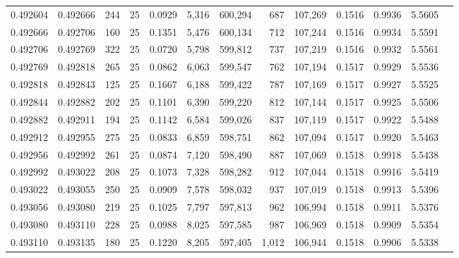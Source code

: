 \begin{tabular}{rrrrrrrrrrrrr}
0.492604 & 0.492666 & 244 &  25 &                                     0.0929 &   5,316 & 600,294 &     687 & 107,269 & 0.1516 & 0.9936 & 5.5605 \\
0.492666 & 0.492706 & 160 &  25 &                                     0.1351 &   5,476 & 600,134 &     712 & 107,244 & 0.1516 & 0.9934 & 5.5591 \\
0.492706 & 0.492769 & 322 &  25 &                                     0.0720 &   5,798 & 599,812 &     737 & 107,219 & 0.1516 & 0.9932 & 5.5561 \\
0.492769 & 0.492818 & 265 &  25 &                                     0.0862 &   6,063 & 599,547 &     762 & 107,194 & 0.1517 & 0.9929 & 5.5536 \\
0.492818 & 0.492843 & 125 &  25 &                                     0.1667 &   6,188 & 599,422 &     787 & 107,169 & 0.1517 & 0.9927 & 5.5525 \\
0.492844 & 0.492882 & 202 &  25 &                                     0.1101 &   6,390 & 599,220 &     812 & 107,144 & 0.1517 & 0.9925 & 5.5506 \\
0.492882 & 0.492911 & 194 &  25 &                                     0.1142 &   6,584 & 599,026 &     837 & 107,119 & 0.1517 & 0.9922 & 5.5488 \\
0.492912 & 0.492955 & 275 &  25 &                                     0.0833 &   6,859 & 598,751 &     862 & 107,094 & 0.1517 & 0.9920 & 5.5463 \\
0.492956 & 0.492992 & 261 &  25 &                                     0.0874 &   7,120 & 598,490 &     887 & 107,069 & 0.1518 & 0.9918 & 5.5438 \\
0.492992 & 0.493022 & 208 &  25 &                                     0.1073 &   7,328 & 598,282 &     912 & 107,044 & 0.1518 & 0.9916 & 5.5419 \\
0.493022 & 0.493055 & 250 &  25 &                                     0.0909 &   7,578 & 598,032 &     937 & 107,019 & 0.1518 & 0.9913 & 5.5396 \\
0.493056 & 0.493080 & 219 &  25 &                                     0.1025 &   7,797 & 597,813 &     962 & 106,994 & 0.1518 & 0.9911 & 5.5376 \\
0.493080 & 0.493110 & 228 &  25 &                                     0.0988 &   8,025 & 597,585 &     987 & 106,969 & 0.1518 & 0.9909 & 5.5354 \\
0.493110 & 0.493135 & 180 &  25 &                                     0.1220 &   8,205 & 597,405 &   1,012 & 106,944 & 0.1518 & 0.9906 & 5.5338 \\

\end{tabular}
